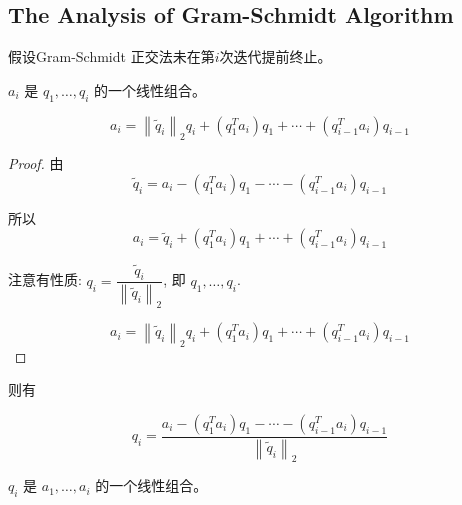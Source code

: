 \subsection{The Analysis of Gram-Schmidt Algorithm}

假设Gram-Schmidt 正交法未在第$i$次迭代提前终止。

\begin{corollary}
    $ a_{i} $ 是 $ q_{1}, \ldots, q_{i} $ 的一个线性组合。
    
    \begin{equation} a_{i}=\left\|\tilde{q}_{i}\right\|_{2} q_{i}+\left(q_{1}^{T} a_{i}\right) q_{1}+\cdots+\left(q_{i-1}^{T} a_{i}\right) q_{i-1} \end{equation}
\end{corollary}

\begin{proof}
    由
    \begin{equation} \widetilde{q}_{i}=a_{i}-\left(q_{1}^{T} a_{i}\right) q_{1}-\cdots-\left(q_{i-1}^{T} a_{i}\right) q_{i-1} \end{equation}

    所以
    \begin{equation}a_{i}= \widetilde{q}_{i}+\left(q_{1}^{T} a_{i}\right) q_{1}+\cdots+\left(q_{i-1}^{T} a_{i}\right) q_{i-1} \end{equation}

    注意有性质: $
    q_{i}=\dfrac{\widetilde{q}_{i}}{\left\|\widetilde{q}_{i}\right\|_{2}}$, 即 $ q_{1}, \ldots, q_{i} $.

    \begin{equation} a_{i}=\left\|\tilde{q}_{i}\right\|_{2} q_{i}+\left(q_{1}^{T} a_{i}\right) q_{1}+\cdots+\left(q_{i-1}^{T} a_{i}\right) q_{i-1} \end{equation}
\end{proof}


则有 

\begin{corollary}
    \begin{equation}q_{i} = \frac{a_{i}-\left(q_{1}^{T} a_{i}\right) q_{1}-\cdots-\left(q_{i-1}^{T} a_{i}\right) q_{i-1}}{\left\|\tilde{q}_{i}\right\|_{2}}\end{equation}
\end{corollary}


\begin{corollary}
    $ q_{i} $ 是 $ a_{1}, \ldots, a_{i} $ 的一个线性组合。
\end{corollary}

